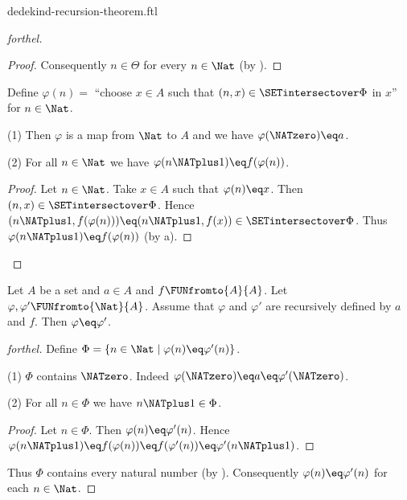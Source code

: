 \documentclass{naproche-library}
\begin{document}
\begin{smodule}[title=Dedekind's Recursion Theorem]{dedekind-recursion-theorem.ftl}
\begin{proof}[forthel]
\begin{proof}
    Consequently $n \in \Theta$ for every $n \in \Nat$ (by ).
  \end{proof}

  Define $\varphi(n) =$ ``choose $x \in A$ such that $(n, x) \in
  \SETintersectover \Phi$ in $x$'' for $n \in \Nat$.

  (1) Then $\varphi$ is a map from $\Nat$ to $A$ and we have
  $\varphi(\NATzero) \eq a$.

  (2) For all $n \in \Nat$ we have $\varphi(n \NATplus 1) \eq
  f(\varphi(n))$.
  \begin{proof}
    Let $n \in \Nat$.
    Take $x \in A$ such that $\varphi(n) \eq x$.
    Then $(n, x) \in \SETintersectover \Phi$.
    Hence $(n \NATplus 1, f(\varphi(n))) \eq (n \NATplus 1, f(x)) \in \SETintersectover \Phi$.
    Thus $\varphi(n \NATplus 1) \eq f(\varphi(n))$ (by a).
  \end{proof}
\end{proof}

\begin{theorem}[forthel,title=Dedekind's Recursion Theorem: Uniqueness,id=dedekind_uniqueness]
  Let $A$ be a set and $a \in A$ and $f \FUNfromto{A}{A}$.
  Let $\varphi, \varphi' \FUNfromto{\Nat}{A}$.
  Assume that $\varphi$ and $\varphi'$ are recursively defined by $a$ and
  $f$.
  Then $\varphi \eq \varphi'$.
\end{theorem}
\begin{proof}[forthel]
  Define $\Phi = \{ n \in \Nat \mid \varphi(n) \eq \varphi'(n) \}$.

  (1) $\Phi$ contains $\NATzero$.
  Indeed $\varphi(\NATzero) \eq a \eq \varphi'(\NATzero)$.

  (2) For all $n \in \Phi$ we have $n \NATplus 1 \in \Phi$.
  \begin{proof}
    Let $n \in \Phi$.
    Then $\varphi(n) \eq \varphi'(n)$.
    Hence $\varphi(n \NATplus 1)
      \eq f(\varphi(n))
      \eq f(\varphi'(n))
      \eq \varphi'(n \NATplus 1)$.
    \end{proof}

  Thus $\Phi$ contains every natural number (by ).
  Consequently $\varphi(n) \eq \varphi'(n)$ for each $n \in \Nat$.
\end{proof}
\end{smodule}
\end{document}
